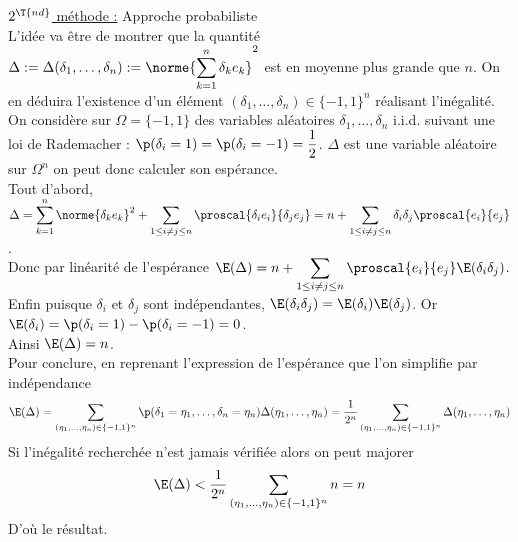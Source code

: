 \documentclass[8pt]{book}
\begin{document}
	\underline{$2^{\T{nd}}$ méthode :} Approche probabiliste\\
	L'idée va être de montrer que la quantité $\Delta:=\Delta(\delta_1,\dots,\delta_n):=\displaystyle\norme{\sum_{k=1}^n\delta_ke_k}^2$ est en moyenne plus grande que $n$. On en déduira l'existence d'un élément $(\delta_1,\dots,\delta_n)\in \{-1,1\}^n$ réalisant l'inégalité.\\
	On considère sur $\Omega=\{-1,1\}$ des variables aléatoires $\delta_1,\dots,\delta_n$ i.i.d. suivant une loi de Rademacher : $\p(\delta_i=1)=\p(\delta_i=-1)=\dfrac{1}{2}$. $\Delta$ est une variable aléatoire sur $\Omega^n$ on peut donc calculer son espérance.\\
	Tout d'abord, $\Delta=\displaystyle\sum_{k=1}^n\norme{\delta_ke_k}^2+\sum_{1\leq i\ne j\leq n}\proscal{\delta_ie_i}{\delta_je_j}=n+\sum_{1\leq i\ne j\leq n}\delta_i\delta_j\proscal{e_i}{e_j}$.\\
	Donc par linéarité de l'espérance $\E(\Delta)=n+\displaystyle\sum_{1\leq i\ne j\leq n}\proscal{e_i}{e_j}\E(\delta_i\delta_j)$.
	Enfin puisque $\delta_i$ et $\delta_j$ sont indépendantes, $\E(\delta_i\delta_j)=\E(\delta_i)\E(\delta_j)$. Or $\E(\delta_i)=\p(\delta_i=1)-\p(\delta_i=-1)=0$.\\
	Ainsi $\E(\Delta)=n$.\\
	Pour conclure, en reprenant l'expression de l'espérance que l'on simplifie par indépendance $$\E(\Delta)=\sum_{(\eta_1,\dots,\eta_n)\in \{-1,1\}^n}\p(\delta_1=\eta_1,\dots,\delta_n=\eta_n)\Delta(\eta_1,\dots,\eta_n)=\frac{1}{2^n}\sum_{(\eta_1,\dots,\eta_n)\in \{-1,1\}^n}\Delta(\eta_1,\dots,\eta_n)$$
	Si l'inégalité recherchée n'est jamais vérifiée alors on peut majorer
	$$\E(\Delta)<\frac{1}{2^n}\sum_{(\eta_1,\dots,\eta_n)\in \{-1,1\}^n}n=n$$
	D'où le résultat.
	
\end{document}
